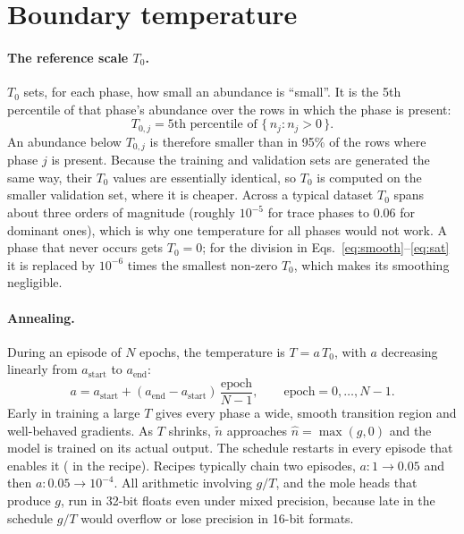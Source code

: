 \documentclass[11pt]{article}
\newcommand{\code}[1]{\texttt{\detokenize{#1}}}
\begin{document}
\section{Boundary temperature}
\label{sec:anneal}

\paragraph{The reference scale $T_0$.}
$T_0$ sets, for each phase, how small an abundance is ``small''. It is the 5th percentile
of that phase's abundance over the rows in which the phase is present:
\begin{equation}
  T_{0,j} = 5\text{th percentile of } \{\, n_j : n_j > 0 \,\}.
\end{equation}
An abundance below $T_{0,j}$ is therefore smaller than in 95\% of the rows where phase $j$
is present. Because the training and validation sets are generated the same way, their
$T_0$ values are essentially identical, so $T_0$ is computed on the smaller validation set,
where it is cheaper. Across a typical dataset $T_0$ spans about three orders of magnitude
(roughly $10^{-5}$ for trace phases to $0.06$ for dominant ones), which is why one
temperature for all phases would not work. A phase that never occurs gets $T_0 = 0$; for
the division in Eqs.~\eqref{eq:smooth}--\eqref{eq:sat} it is replaced by $10^{-6}$ times
the smallest non-zero $T_0$, which makes its smoothing negligible.

\paragraph{Annealing.}
During an episode of $N$ epochs, the temperature is $T = a\,T_0$, with $a$ decreasing
linearly from $a_{\text{start}}$ to $a_{\text{end}}$:
\begin{equation}
  a = a_{\text{start}} + (a_{\text{end}} - a_{\text{start}})\,\frac{\text{epoch}}{N-1},
  \qquad \text{epoch} = 0, \dots, N-1.
\end{equation}
Early in training a large $T$ gives every phase a wide, smooth transition region and
well-behaved gradients. As $T$ shrinks, $\tilde n$ approaches $\hat n = \max(g,0)$ and the
model is trained on its actual output. The schedule restarts in every episode that enables
it (\code{boundary_temperature} in the recipe). Recipes typically chain two episodes,
$a: 1 \to 0.05$ and then $a: 0.05 \to 10^{-4}$. All arithmetic involving $g/T$, and the mole
heads that produce $g$, run in 32-bit floats even under mixed precision, because late in
the schedule $g/T$ would overflow or lose precision in 16-bit formats.
\end{document}
